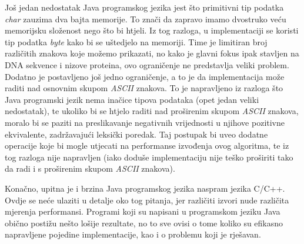Još jedan nedostatak Java programskog jezika jest što primitivni tip podatka \textit{char} zauzima dva bajta memorije. To znači da zapravo imamo dvostruko veću memorijsku složenost nego što bi htjeli. Iz tog razloga, u implementaciji se koristi tip podatka \textit{byte} kako bi se uštedjelo na memoriji. Time je limitiran broj različitih znakova koje možemo prikazati, no kako je glavni fokus ipak stavljen na DNA sekvence i nizove proteina, ovo ograničenje ne predstavlja veliki problem. Dodatno je postavljeno još jedno ograničenje, a to je da implementacija može raditi nad osnovnim skupom \textit{ASCII} znakova. To je napravljeno iz razloga što Java programski jezik nema  inačice tipova podataka (opet jedan veliki nedostatak), te ukoliko bi se htjelo raditi nad proširenim skupom \textit{ASCII} znakova, moralo bi se paziti na preslikavanje negativnih vrijednosti u njihove pozitivne ekvivalente, zadržavajući leksički poredak. Taj postupak bi uveo dodatne operacije koje bi mogle utjecati na performanse izvođenja ovog algoritma, te iz tog razloga nije napravljen (iako doduše implementaciju nije teško proširiti tako da radi i s proširenim skupom \textit{ASCII} znakova). 

Konačno, upitna je i brzina Java programskog jezika naspram jezika C/C++. Ovdje se neće ulaziti u detalje oko tog pitanja, jer različiti izvori nude različita mjerenja performansi. Programi koji su napisani u programskom jeziku Java obično postižu nešto lošije rezultate, no to sve ovisi o tome koliko su efikasno napravljene pojedine implementacije, kao i o problemu koji je rješavan. 



